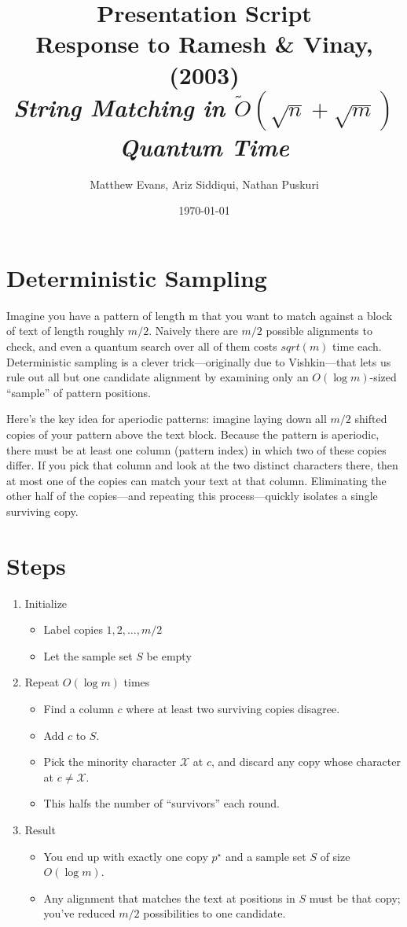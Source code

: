\documentclass[11pt]{article}
\title{Presentation Script \\ 
\Large{Response to Ramesh \& Vinay, (2003)\\ 
\small{\textit{String Matching in \(\tilde{O}(\sqrt{n} + \sqrt{m})\) Quantum Time}} }}
\author{%
\normalsize{Matthew Evans, Ariz Siddiqui, Nathan Puskuri}
}
\date{\today}
\begin{document}
\maketitle

\section*{Deterministic Sampling}
Imagine you have a pattern of length m that you want to match against a block of text of length roughly \(m/2\). Naively there are \(m/2\) possible alignments to check, and even a quantum search over all of them costs \(sqrt(m)\) time each. Deterministic sampling is a clever trick—originally due to Vishkin—that lets us rule out all but one candidate alignment by examining only an \(O(\log m)\)-sized ``sample'' of pattern positions.

Here's the key idea for aperiodic patterns: imagine laying down all \(m/2\) shifted copies of your pattern above the text block. Because the pattern is aperiodic, there must be at least one column (pattern index) in which two of these copies differ. If you pick that column and look at the two distinct characters there, then at most one of the copies can match your text at that column. Eliminating the other half of the copies—and repeating this process—quickly isolates a single surviving copy.

\section*{Steps}
\begin{enumerate}
    \item Initialize \begin{itemize}
              \item Label copies \(1, 2, \dots, m/2\)
              \item Let the sample set \(S\) be empty
          \end{itemize}
    \item Repeat \(O(\log m)\) times \begin{itemize}
              \item Find a column \(c\) where at least two surviving copies disagree.
              \item Add \(c\) to \(S\).
              \item Pick the minority character \(\mathcal{X}\) at \(c\), and discard any copy whose character at \(c \neq \mathcal{X}\).
              \item This halfs the number of ``survivors'' each round.
          \end{itemize}
    \item Result \begin{itemize}
              \item You end up with exactly one copy \(p^\star\) and a sample set \(S\) of size \(O(\log m)\).
              \item Any alignment that matches the text at \textit{} positions in \(S\) must be that copy; you've reduced \(m/2\) possibilities to one candidate.
          \end{itemize}
\end{enumerate}
\end{document}
